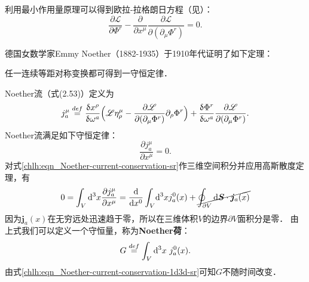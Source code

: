 利用最小作用量原理可以得到欧拉-拉格朗日方程（见\parencite[Eq.(2.14)]{Greiner-FQ-1996}）：
\begin{equation}\label{chlh:eqn_lagrange-Phi-sr}
    \frac{\partial \mathscr{L}}{\partial \Phi^{r}} - \frac{\partial}{\partial x^\mu} 
    \frac{\partial \mathscr{L}} {\partial (\partial_\mu \Phi^r )}  =0.
\end{equation}


德国女数学家Emmy Noether（1882-1935）于1910年代证明了如下定理：
\begin{theorem}
    任一连续等距对称变换都可得到一守恒定律．
\end{theorem}


Noether流（\parencite[\S 2.4]{Greiner-FQ-1996}式(2.53)）定义为
\begin{equation}\label{chlh:eqn_Noether-current-sr}
    j^\mu_{a} \overset{def}{=}  \frac{\updelta x^{\rho} }{\updelta\omega^{a}} 
    \Bigl(  \mathscr{L} \eta_\rho^\mu   -   
    \frac{\partial \mathscr{L}}{\partial(\partial_{\mu}\Phi^{r})} 
    \partial_\rho \Phi^{r}  \Bigr)  + \frac{\updelta\Phi^{r}}{\updelta\omega^{a}}
    \frac{\partial \mathscr{L}}{\partial(\partial_{\mu}\Phi^{r})}.
\end{equation}
Noether流满足如下守恒定律：
\begin{equation}\label{chlh:eqn_Noether-current-conservation-sr}
    \frac{\partial j^\mu_{a}}{\partial x^{\mu}} =0 .
\end{equation}
对式\eqref{chlh:eqn_Noether-current-conservation-sr}作三维空间积分并应用高斯散度定理，有
\begin{align}\label{chlh:eqn_Noether-current-conservation-1d3d-sr}
    0 = \int_{V}  {\rm d}^3 x  \frac{\partial j^\mu_{a}}{\partial x^{\mu}} 
    = \frac{{\rm d} }{{\rm d} x^{0}}  \int_{V} \! {\rm d}^3 x  j^0_{a}(x) 
    + \cancel{\oint_{\partial V}  {\rm d}\boldsymbol{S}\cdot  \boldsymbol{j}_{a}(x) }
\end{align}
因为$\boldsymbol{j}_{a}(x)$在无穷远处迅速趋于零，所以在三维体积$V$的边界$\partial V$面积分是零．
由上式我们可以定义一个守恒量，称为{\heiti \bfseries Noether荷}：
\begin{equation}\label{chlh:eqn_Noether-conservation-sr}
    G\overset{def}{=} \int_{V}  {\rm d}^3 x  \ j^0_{a}(x) .
\end{equation}
由式\eqref{chlh:eqn_Noether-current-conservation-1d3d-sr}可知$G$不随时间改变．

